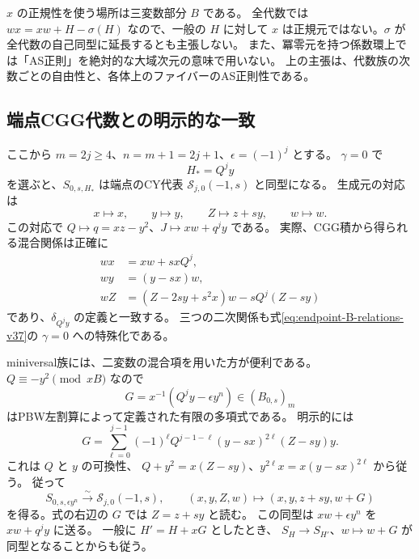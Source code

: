 \begin{remark}
$x$ の正規性を使う場所は三変数部分 $B$ である。
全代数では $wx=xw+H-\sigma(H)$ なので、一般の $H$ に対して
$x$ は正規元ではない。$\sigma$ が全代数の自己同型に延長するとも主張しない。
また、冪零元を持つ係数環上では「AS正則」を絶対的な大域次元の意味で用いない。
上の主張は、代数族の次数ごとの自由性と、各体上のファイバーのAS正則性である。
\end{remark}

\subsection{端点CGG代数との明示的な一致}

ここから $m=2j\ge4$、$n=m+1=2j+1$、$\epsilon=(-1)^j$ とする。
$\gamma=0$ で
\[
 H_*=Q^j y
\]
を選ぶと、$S_{0,s,H_*}$ は端点のCY代表
$\mathcal S_{j,0}(-1,s)$ と同型になる。
生成元の対応は
\begin{equation}
\label{eq:endpoint-CGG-identification-v37}
 x\longmapsto x,\qquad y\longmapsto y,\qquad
 Z\longmapsto z+sy,\qquad w\longmapsto w.
\end{equation}
この対応で $Q\mapsto q=xz-y^2$、$J\mapsto xw+q^j y$ である。
実際、CGG積から得られる混合関係は正確に
\begin{equation}
\label{eq:endpoint-CGG-mixed-v37}
\begin{aligned}
 wx&=xw+s xQ^j,\\
 wy&=(y-sx)w,\\
 wZ&=(Z-2sy+s^2x)w-sQ^j(Z-sy)
\end{aligned}
\end{equation}
であり、$\delta_{Q^j y}$ の定義と一致する。
三つの二次関係も式\eqref{eq:endpoint-B-relations-v37}の $\gamma=0$ への特殊化である。

miniversal族には、二変数の混合項を用いた方が便利である。
$Q\equiv-y^2\pmod{xB}$ なので
\[
 G=x^{-1}(Q^j y-\epsilon y^n)\in(B_{0,s})_m
\]
はPBW左割算によって定義された有限の多項式である。
明示的には
\[
 G=\sum_{\ell=0}^{j-1}(-1)^\ell
 Q^{j-1-\ell}(y-sx)^{2\ell}(Z-sy)y.
\]
これは $Q$ と $y$ の可換性、
$Q+y^2=x(Z-sy)$、$y^{2\ell}x=x(y-sx)^{2\ell}$ から従う。
従って
\begin{equation}
\label{eq:endpoint-binary-CGG-v37}
 S_{0,s,\epsilon y^n}\xrightarrow{\ \sim\ }\mathcal S_{j,0}(-1,s),
 \qquad (x,y,Z,w)\longmapsto(x,y,z+sy,w+G)
\end{equation}
を得る。式の右辺の $G$ では $Z=z+sy$ と読む。
この同型は $xw+\epsilon y^n$ を $xw+q^j y$ に送る。
一般に $H'=H+xG$ としたとき、
$S_H\to S_{H'}$、$w\mapsto w+G$ が同型となることからも従う。

